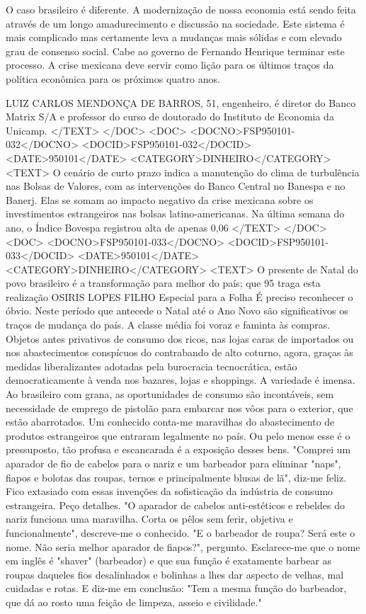 O caso brasileiro é diferente. A modernização de nossa economia está sendo feita através de um longo amadurecimento e discussão na sociedade. Este sistema é mais complicado mas certamente leva a mudanças mais sólidas e com elevado grau de consenso social. Cabe ao governo de Fernando Henrique terminar este processo. A crise mexicana deve servir como lição para os últimos traços da política econômica para os próximos quatro anos.

LUIZ CARLOS MENDONÇA DE BARROS, 51, engenheiro, é diretor do Banco Matrix S/A e professor do curso de doutorado do Instituto de Economia da Unicamp.
</TEXT>
</DOC>
<DOC>
<DOCNO>FSP950101-032</DOCNO>
<DOCID>FSP950101-032</DOCID>
<DATE>950101</DATE>
<CATEGORY>DINHEIRO</CATEGORY>
<TEXT>
O cenário de curto prazo indica a manutenção do clima de turbulência nas Bolsas de Valores, com as intervenções do Banco Central no Banespa e no Banerj. Elas se somam ao impacto negativo da crise mexicana sobre os investimentos estrangeiros nas bolsas latino-americanas.
Na última semana do ano, o Índice Bovespa registrou alta de apenas 0,06%
</TEXT>
</DOC>
<DOC>
<DOCNO>FSP950101-033</DOCNO>
<DOCID>FSP950101-033</DOCID>
<DATE>950101</DATE>
<CATEGORY>DINHEIRO</CATEGORY>
<TEXT>
O presente de Natal do povo brasileiro é a transformação para melhor do país; que 95 traga esta realização 
OSIRIS LOPES FILHO 
Especial para a Folha 
É preciso reconhecer o óbvio. Neste período que antecede o Natal até o Ano Novo são significativos os traços de mudança do país. A classe média foi voraz e faminta às compras. Objetos antes privativos de consumo dos ricos, nas lojas caras de importados ou nos abastecimentos conspícuos do contrabando de alto coturno, agora, graças às medidas liberalizantes adotadas pela burocracia tecnocrática, estão democraticamente à venda nos bazares, lojas e shoppings. A variedade é imensa. Ao brasileiro com grana, as oportunidades de consumo são incontáveis, sem necessidade de emprego de pistolão para embarcar nos vôos para o exterior, que estão abarrotados.
Um conhecido conta-me maravilhas do abastecimento de produtos estrangeiros que entraram legalmente no país. Ou pelo menos esse é o pressuposto, tão profusa e escancarada é a exposição desses bens.
"Comprei um aparador de fio de cabelos para o nariz e um barbeador para eliminar "naps", fiapos e bolotas das roupas, ternos e principalmente blusas de lã", diz-me feliz.
Fico extasiado com essas invenções da sofisticação da indústria de consumo estrangeira. Peço detalhes. "O aparador de cabelos anti-estéticos e rebeldes do nariz funciona uma maravilha. Corta os pêlos sem ferir, objetiva e funcionalmente", descreve-me o conhecido. "E o barbeador de roupa? Será este o nome. Não seria melhor aparador de fiapos?", pergunto. Esclarece-me que o nome em inglês é "shaver" (barbeador) e que sua função é exatamente barbear as roupas daqueles fios desalinhados e bolinhas a lhes dar aspecto de velhas, mal cuidadas e rotas. E diz-me em conclusão: "Tem a mesma função do barbeador, que dá ao rosto uma feição de limpeza, asseio e civilidade."
